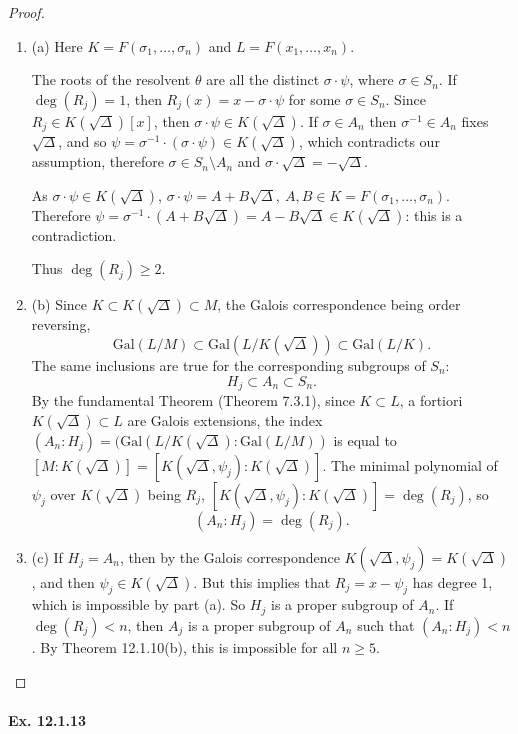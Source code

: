 \documentclass[11pt,a4paper]{article}
\newcommand{\be} {\begin{enumerate}}
\newcommand{\ee} {\end{enumerate}}
\newcommand{\Gal}{\mathrm{Gal}}
\begin{document}
\begin{proof}
\be
\item[(a)]
Here $K = F(\sigma_1,\ldots,\sigma_n)$ and $L = F(x_1,\ldots,x_n)$.

The roots of the resolvent $\theta$ are all the distinct $\sigma \cdot \psi$, where $\sigma \in S_n$. If $\deg(R_j)=1$, then $R_j(x) = x - \sigma \cdot \psi$ for some $\sigma \in S_n$. Since $R_j \in K(\sqrt{\Delta})[x]$, then $\sigma \cdot \psi \in K(\sqrt{\Delta})$. If $\sigma \in A_n$ then $\sigma^{-1} \in A_n$ fixes $\sqrt{\Delta}$,  and so $\psi = \sigma^{-1} \cdot (\sigma \cdot \psi) \in K(\sqrt{\Delta})$, which contradicts our assumption, therefore $\sigma \in S_n \setminus A_n$ and $\sigma \cdot \sqrt{\Delta} = - \sqrt{\Delta}$.

As $\sigma \cdot \psi \in K(\sqrt{\Delta})$, $\sigma \cdot \psi = A + B \sqrt{\Delta}, \ A,B \in K = F(\sigma_1,\ldots,\sigma_n)$. Therefore $\psi = \sigma^{-1}\cdot (A+B \sqrt{\Delta}) = A - B \sqrt{\Delta} \in K(\sqrt{\Delta})$: this is a contradiction.

Thus $\deg(R_j) \geq 2$.

\item[(b)] Since $K \subset K(\sqrt{\Delta}) \subset M$, the Galois correspondence being order reversing,
$$\Gal(L/M) \subset \Gal(L/K(\sqrt{\Delta})) \subset \Gal(L/K).$$
The same inclusions are true for the corresponding subgroups of $S_n$:
$$H_j \subset A_n \subset S_n.$$
By the fundamental Theorem (Theorem 7.3.1), since $K \subset L$, a fortiori $K(\sqrt{\Delta}) \subset L$ are Galois extensions,  the index  $(A_n:H_j) = (\Gal(L/K(\sqrt{\Delta}) : \Gal(L/M))$ is equal to $[M : K(\sqrt{\Delta})] = [K(\sqrt{\Delta},\psi_j ): K(\sqrt{\Delta})]$. The minimal polynomial of $\psi_j$ over $K(\sqrt{\Delta})$ being $R_j$, $[K(\sqrt{\Delta},\psi_j):K(\sqrt{\Delta})] = \deg(R_j)$, so
$$(A_n:H_j) = \deg(R_j).$$

\item[(c)] If $H_j = A_n$, then by the Galois correspondence $K(\sqrt{\Delta},\psi_j) = K(\sqrt{\Delta})$, and then $\psi_j \in K(\sqrt{\Delta})$. But this implies that $R_j = x - \psi_j$ has degree 1, which is impossible by part (a). So $H_j$ is a proper subgroup of $A_n$.  If $\deg(R_j) < n$, then $A_j$ is a proper subgroup of $A_n$ such that $(A_n:H_j) <n$. By Theorem 12.1.10(b), this is impossible for all $n\geq 5$.
\ee
\end{proof}

\paragraph{Ex. 12.1.13}
\end{document}
